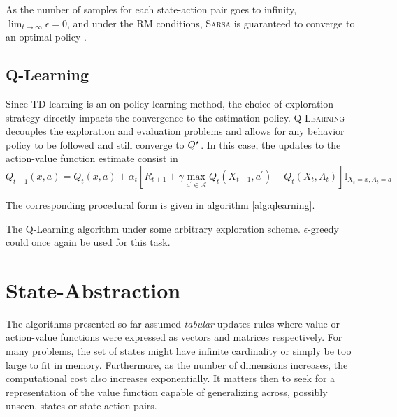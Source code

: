 As the number of samples for each state-action pair goes to infinity, $\lim_{t \to
\infty} \epsilon = 0$, and under the RM conditions, \textsc{Sarsa} is guaranteed to converge to
an optimal policy \parencite{SuttonBarto1998}. 

\subsection{Q-Learning}

Since TD learning is an on-policy learning method, the choice of exploration strategy
directly impacts the convergence to the estimation policy. \textsc{Q-Learning}
\parencite{Watkins1989} decouples the exploration and evaluation problems and allows for
any behavior policy to be followed and still converge to $Q^\star$. In this case,
the updates to the action-value function estimate consist in
\begin{equation}
Q_{t+1} (x,a) = Q_t(x,a) + \alpha_t \left[ R_{t+1} + \gamma \max_{a^\prime \in
\mathcal{A}} Q_t(X_{t+1}, a^\prime) - Q_t(X_t, A_t) \right] \mathbb{I}_{X_t = x, A_t = a} 
\label{eq:qlearning-update}
\end{equation}

The corresponding procedural form is given in algorithm \ref{alg:qlearning}.

\begin{algorithm}
\DontPrintSemicolon
{}
\caption{The Q-Learning algorithm under some arbitrary exploration scheme.
$\epsilon$-greedy could once again be used for this task.}
\label{alg:qlearning}
\end{algorithm}

\section{State-Abstraction}
The algorithms presented so far assumed \textit{tabular} updates rules where value or
action-value functions were expressed as vectors and matrices respectively. For many
problems, the set of states might have infinite cardinality or simply be too large to fit in
memory. Furthermore, as the number of dimensions increases, the computational cost
also increases exponentially. It matters then to seek for a representation of the
value function capable of generalizing across, possibly unseen, states or state-action
pairs.

